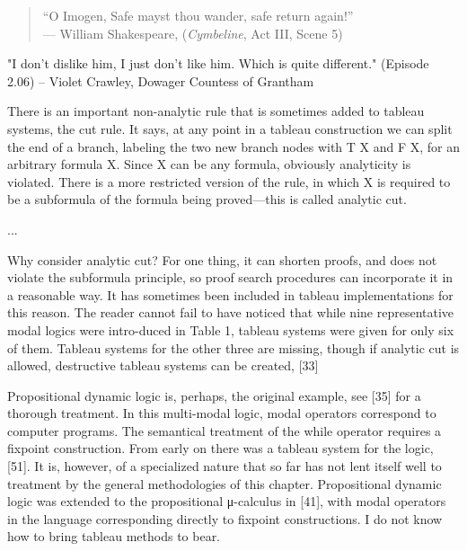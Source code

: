
\clearpage

\vspace*{2in}
\begin{quote}
  \begin{center}
    ``O Imogen, Safe mayst thou wander, safe return again!'' \\
    \hspace{3em}  --- William Shakespeare, (\textit{Cymbeline}, Act III, Scene 5)
  \end{center}
\end{quote}
\vspace*{\fill}

"I don't dislike him, I just don't like him. Which is quite
 different." (Episode 2.06) -- Violet Crawley, Dowager Countess of Grantham






There is an important non-analytic rule that is sometimes added to
tableau systems, the cut rule. It says, at any point in a tableau
construction we can split the end of a branch, labeling the two new
branch nodes with T X and F X, for an arbitrary formula X. Since X can
be any formula, obviously analyticity is violated. There is a more
restricted version of the rule, in which X is required to be a
subformula of the formula being proved—this is called analytic cut.

...

Why consider analytic cut? For one thing, it can shorten proofs, and
does not violate the subformula principle, so proof search procedures
can incorporate it in a reasonable way. It has sometimes been included
in tableau implementations for this reason. The reader cannot fail to
have noticed that while nine representative modal logics were
intro-duced in Table 1, tableau systems were given for only six of
them. Tableau systems for the other three are missing, though if
analytic cut is allowed, destructive tableau systems can be created,
[33]

Propositional dynamic logic is, perhaps, the original example, see
[35] for a thorough treatment. In this multi-modal logic, modal
operators correspond to computer programs. The semantical treatment of
the while operator requires a fixpoint construction. From early on
there was a tableau system for the logic, [51]. It is, however, of a
specialized nature that so far has not lent itself well to treatment
by the general methodologies of this chapter. Propositional dynamic
logic was extended to the propositional μ-calculus in [41], with modal
operators in the language corresponding directly to fixpoint
constructions. I do not know how to bring tableau methods to bear.


